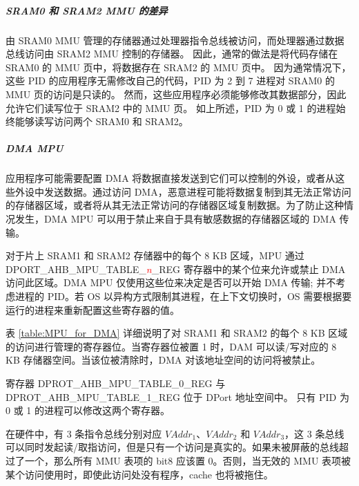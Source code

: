 \subparagraph{SRAM0 和 SRAM2 MMU 的差异}

由 SRAM0 MMU 管理的存储器通过处理器指令总线被访问，而处理器通过数据总线访问由 SRAM2 MMU 控制的存储器。 因此，通常的做法是将代码存储在 SRAM0 的 MMU 页中，将数据存在 SRAM2 的 MMU 页中。 因为通常情况下，这些 PID 的应用程序无需修改自己的代码，PID 为 2 到 7 进程对 SRAM0 的 MMU 页的访问是只读的。 然而，这些应用程序必须能够修改其数据部分，因此允许它们读写位于 SRAM2 中的 MMU 页。 如上所述，PID 为 0 或 1 的进程始终能够读写访问两个 SRAM0 和 SRAM2。

\subparagraph{DMA MPU}


应用程序可能需要配置 DMA 将数据直接发送到它们可以控制的外设，或者从这些外设中发送数据。通过访问 DMA，恶意进程可能将数据复制到其无法正常访问的存储器区域，或者将从其无法正常访问的存储器区域复制数据。为了防止这种情况发生，DMA MPU 可以用于禁止来自于具有敏感数据的存储器区域的 DMA 传输。

对于片上 SRAM1 和 SRAM2 存储器中的每个 8 KB 区域，MPU 通过 DPORT\_AHB\_MPU\_TABLE\_\textcolor{red}{\it{n}}\_REG 寄存器中的某个位来允许或禁止 DMA 访问此区域。DMA MPU 仅使用这些位来决定是否可以开始 DMA 传输; 并不考虑进程的 PID。若 OS 以异构方式限制其进程，在上下文切换时，OS 需要根据要运行的进程来重新配置这些寄存器的值。


表 \ref{table:MPU_for_DMA} 详细说明了对 SRAM1 和 SRAM2 的每个 8 KB 区域的访问进行管理的寄存器位。当寄存器位被置 1 时，DAM 可以读/写对应的 8 KB 存储器空间。当该位被清除时，DMA 对该地址空间的访问将被禁止。




寄存器 DPROT\_AHB\_MPU\_TABLE\_0\_REG 与 DPROT\_AHB\_MPU\_TABLE\_1\_REG 位于 DPort 地址空间中。
只有 PID 为 0 或 1 的进程可以修改这两个寄存器。

\begin{tiplisting}
在硬件中，有 3 条指令总线分别对应 $VAddr_1$、$VAddr_2$ 和 $VAddr_3$，这 3 条总线可以同时发起读/取指访问，但是只有一个访问是真实的。如果未被屏蔽的总线超过了一个，那么所有 MMU 表项的 bit8 应该置 0。否则，当无效的 MMU 表项被某个访问使用时，即使此访问处没有程序，cache 也将被拖住。
\end{tiplisting}